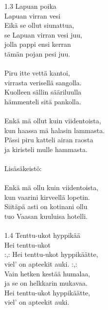 1.3 Lapuan poika \\
Lapuan virran vesi \\
            Eikä se ollut siunattua, \\
            se Lapuan virran vesi juu, \\
            jolla pappi ensi kerran \\
            tämän pojan pesi juu. \\
\hspace{10mm} \\
            Piru itte vettä kantoi, \\
            virrasta verisellä sangolla. \\
            Kuolleen sällin sääriluulla \\
            hämmenteli sitä pankolla. \\
\hspace{10mm} \\
            Enkä mä ollut kuin viidentoista, \\
            kun haassa mä halasin lammasta. \\
            Pässi piru katteli airan raosta \\
            ja kiristeli mulle hammasta. \\
\hspace{10mm} \\
            Lisäsäkeistö: \\
\hspace{10mm} \\
            Enkä mä ollu kuin viidentoista, \\
            kun vaarini kirveellä lopetin. \\
            Siitäpä asti on kotinani ollu \\
            tuo Vaasan kuuluisa hotelli. \\
\hspace{10mm} \\
1.4 Tenttu-ukot hyppikää \\
Hei tenttu-ukot \\
            :,: Hei tenttu-ukot hyppikäätte, \\
            viel' on apteekit auki. :,: \\
            Vain hetken kestää humalaa, \\
            ja se on helkkarin mukavaa. \\
            Hei tenttu-ukot hyppikäätte, \\
            viel' on apteekit auki. \\
